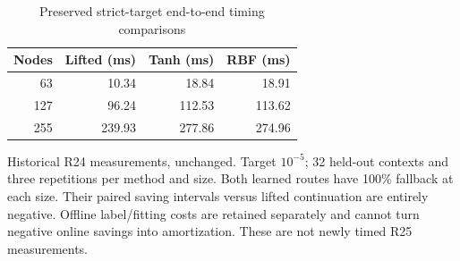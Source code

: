\begin{table}[htbp]
\centering\small
\caption{Preserved strict-target end-to-end timing comparisons}\label{tab:historical}
\begin{tabular}{rrrr}
\toprule
Nodes & Lifted (ms) & Tanh (ms) & RBF (ms) \\ \midrule
63 & 10.34 & 18.84 & 18.91 \\
127 & 96.24 & 112.53 & 113.62 \\
255 & 239.93 & 277.86 & 274.96 \\
\bottomrule
\end{tabular}
\par\smallskip
\begin{minipage}{.98\textwidth}\footnotesize Historical R24 measurements, unchanged. Target $10^{-5}$; 32 held-out contexts and three repetitions per method and size. Both learned routes have 100\% fallback at each size. Their paired saving intervals versus lifted continuation are entirely negative. Offline label/fitting costs are retained separately and cannot turn negative online savings into amortization. These are not newly timed R25 measurements.\end{minipage}
\end{table}
